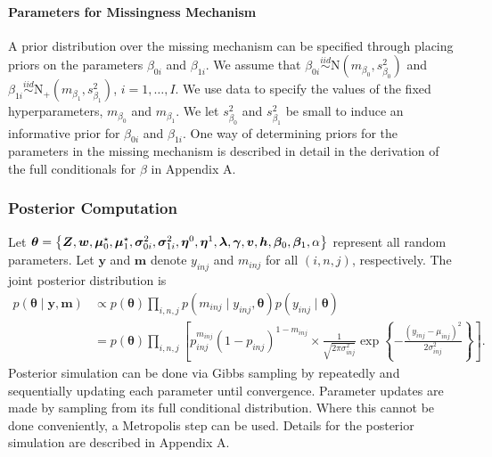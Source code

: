 \documentclass[12pt,]{article}
\newcommand{\bc}[1]{ \left\{#1\right\} }
\newcommand{\N}{ \mathcal{N} }
\newcommand{\iid}{\overset{iid}{\sim}}
\def\N{\text{N}}
\def\btheta{\bm{\theta}}
\def\y{\bm{y}}
\newcommand\m{\bm{m}}
\newcommand{\bZ}{\mbox{\boldmath $Z$}}
\newcommand{\bw}{\mbox{\boldmath $w$}}
\begin{document}
\paragraph*{Parameters for Missingness Mechanism}
A prior distribution over the missing mechanism can be specified through
placing priors on the parameters $\beta_{0i}$ and $\beta_{1i}$. 
%
We assume that $\beta_{0i} \iid \N(m_{\beta_0}, s^2_{\beta_0})$ and $\beta_{1i}
\iid \N_+(m_{\beta_1}, s^2_{\beta_1})$, $i=1, \ldots, I$.  We use data to
specify the values of the fixed hyperparameters, $m_{\beta_0}$ and
$m_{\beta_1}$. We let $s^2_{\beta_0}$ and $s^2_{\beta_1}$ be small to induce an
informative prior for $\beta_{0i}$ and $\beta_{1i}$. One way of determining
priors for the parameters in the missing mechanism is described in detail in 
the derivation of the full conditionals for $\beta$ in Appendix A.



\subsubsection{Posterior Computation}\label{sampling-via-mcmc}
Let $\btheta=\bc{\bZ, \bw, \bm \mu^\star_0, \bm \mu^\star_1, \bm \sigma^2_{0i},
\bm \sigma^2_{1i}, \bm \eta^0, \bm \eta^1, \bm \lambda, \bm \gamma, \bm v, \bm
h, \bm \beta_0, \bm \beta_1, \alpha}$ represent all random parameters.  Let
\(\y\) and $\m$ denote $y_{inj}$ and $m_{inj}$ for all $(i,n,j)$, respectively.
The joint posterior distribution is 
\begin{align*}
p(\btheta \mid \y, \m) &\propto 
p(\btheta) \prod_{i,n,j} p(m_{inj} \mid y_{inj}, \btheta) p(y_{inj} \mid \btheta) \nonumber\\
&=  
p(\btheta)
\prod_{i,n,j} \left[
  p_{inj}^{m_{inj}} (1-p_{inj})^{1-m_{inj}} \times 
   \frac{1}{\sqrt{2\pi\sigma^2_{inj}}} \exp\bc{-\frac{(y_{inj}-\mu_{inj})^2}{2\sigma^2_{inj}}}
\right].
\end{align*}
Posterior simulation can be done via Gibbs sampling by repeatedly and
sequentially updating each parameter until convergence. Parameter updates are
made by sampling from its full conditional distribution. Where this cannot be
done conveniently, a Metropolis step can be used.  Details for the posterior
simulation are described in Appendix A. 
\end{document}
